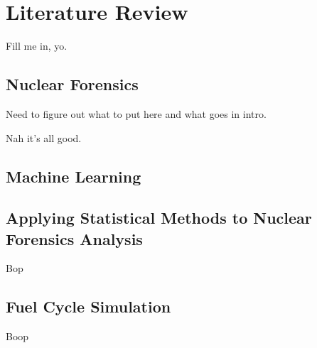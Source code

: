 \chapter{Literature Review}
\label{ch:litrev}

Fill me in, yo.

\section{Nuclear Forensics}
\label{sec:nfoverview}

Need to figure out what to put here and what goes in intro.

Nah it's all good. 

\section{Machine Learning}
\label{sec:mlback}


\section{Applying Statistical Methods to Nuclear Forensics Analysis}
\label{sec:stats4nf}

Bop

\section{Fuel Cycle Simulation}
\label{sec:fcsim}

Boop

